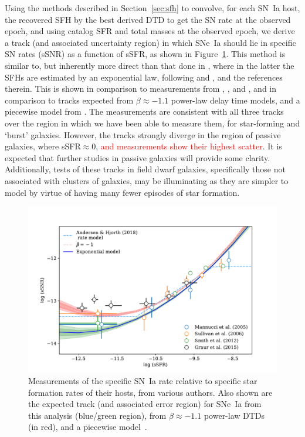 \documentclass[apj, linenumbers]{aastex62}
\begin{document}
Using the methods described in Section~\ref{sec:sfh} to convolve, for each SN~Ia host, the recovered SFH by the best derived DTD to get the SN rate at the observed epoch, and using catalog SFR and total masses at the observed epoch, we derive a track (and associated uncertainty region) in which SNe~Ia should lie in specific SN rates (sSNR) as a function of sSFR, as shown in Figure~\ref{fig:ssfr}. This method is similar to, but inherently more direct than that done in \cite{Graur:2015fk}, where in the latter the SFHs are estimated by an exponential law, following \cite{Gallazzi:2005rf} and
\cite{Kauffmann:2003sj}, and the references therein. This is shown in comparison to measurements from \cite{Mannucci:2005}, \cite{Sullivan:2006a}, and \cite{Smith:2012lr}, and in comparison to tracks expected from $\beta\approx-1.1$ power-law delay time models, and a piecewise model from \cite{Andersen:2018dp}. The measurements are consistent with all three tracks over the region in which we have been able to measure them, for star-forming and `burst' galaxies. However, the tracks strongly diverge in the region of passive galaxies, where sSFR$\approx0$, \textcolor{red}{and measurements show their highest scatter}. It is expected that further studies in passive galaxies will provide some clarity. Additionally, tests of these tracks in field dwarf galaxies, specifically those not associated with clusters of galaxies, may be illuminating as they are simpler to model by virtue of having many fewer episodes of star formation. 

\begin{figure}[t]
   \centering
   \includegraphics[width=6.1in]{figure_ssfr.pdf}
   \caption{\footnotesize Measurements of the specific SN~Ia rate relative to specific star formation rates of their hosts, from various authors. Also shown are the expected track (and associated error region) for SNe~Ia from this analysis (blue/green region), from $\beta\approx-1.1$ power-law DTDs (in red), and a piecewise model~\cite[][ blue-dashed line]{Andersen:2018dp}.}
   \label{fig:ssfr}
\end{figure}
\end{document}
